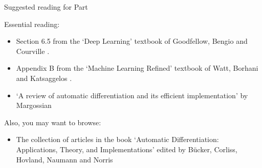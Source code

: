 %
%
%

\begin{frame}{Suggested reading for Part \thispart}

    {
        \small
        Essential reading:
        \begin{itemize}
            \scriptsize
            \item Section 6.5 from the `Deep Learning' 
            textbook of Goodfellow, Bengio and Courville \cite{Goodfellow:2017MITDL}.
            \item Appendix B from the `Machine Learning Refined' 
            textbook of Watt, Borhani and Katsaggelos \cite{Watt:2016Cambridge}.
            \item `A review of automatic differentiation and its 
            efficient implementation' by Margossian \cite{Margossian:2019ad}
        \end{itemize}
        
        Also, you may want to browse:
        \begin{itemize}
            \scriptsize
            \item The collection of articles
             in the book `Automatic Differentiation: Applications, Theory, and Implementations'
             edited by B{\"u}cker, Corliss, Hovland, Naumann and Norris \cite{Bucker:2005ABo}
        \end{itemize}
    }
    

\end{frame}